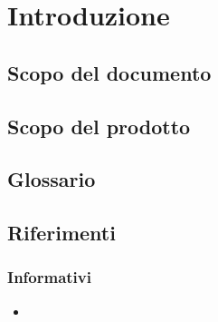 \section{Introduzione}
\subsection{Scopo del documento}

\subsection{Scopo del prodotto}

\subsection{Glossario}

\subsection{Riferimenti}
\subsubsection{Informativi}
\begin{itemize}
	\item 
\end{itemize}